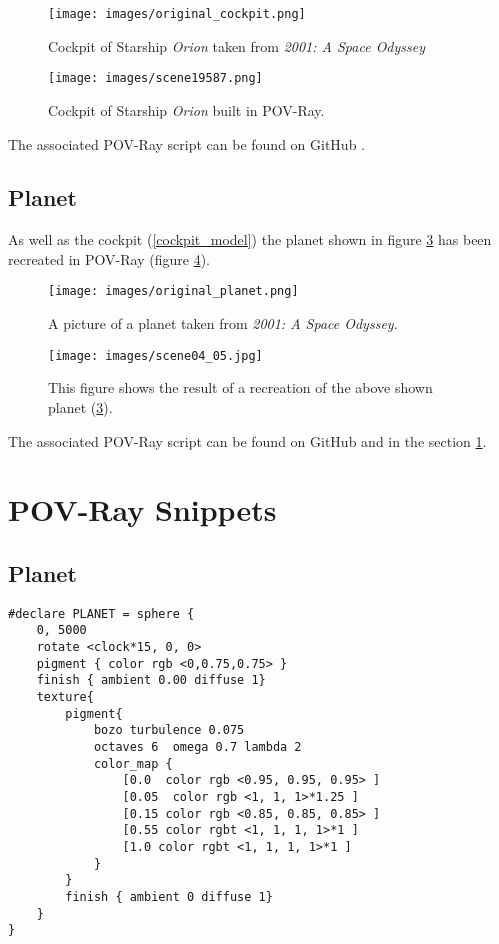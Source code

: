 \begin{figure}[ht]
	\centering
	\texttt{[image: images/original\_cockpit.png]}
	\caption{Cockpit of Starship \textit{Orion} taken from \textit{2001: A Space Odyssey}}
	\label{cockpit_original}
\end{figure}

\begin{figure}[ht]
	\centering
	\texttt{[image: images/scene19587.png]}
	\caption{Cockpit of Starship \textit{Orion} built in POV-Ray.}
	\label{cockpit_povray}
\end{figure}

The associated POV-Ray script can be found on GitHub \cite{Quving}.

\newpage
\subsection{Planet}
As well as the cockpit (\ref{cockpit_model}) the planet shown in figure \ref{planet_original} has been recreated in POV-Ray (figure \ref{planet_povray}).
\begin{figure}[ht]
	\centering
	\texttt{[image: images/original\_planet.png]}
	\caption{A picture of a planet taken from \textit{2001: A Space Odyssey}.}
	\label{planet_original}
\end{figure}

\begin{figure}[ht]
	\centering
	\texttt{[image: images/scene04\_05.jpg]}
	\caption{This figure shows the result of a recreation of the above shown planet (\ref{planet_original}).}
	\label{planet_povray}
\end{figure}

The associated POV-Ray script can be found on GitHub \cite{Quving} and in the section \ref{povray_snippets}.

\newpage
\section{POV-Ray Snippets} \label{povray_snippets}

\subsection{Planet}

\begin{lstlisting}
#declare PLANET = sphere {
	0, 5000
	rotate <clock*15, 0, 0>
	pigment { color rgb <0,0.75,0.75> }
	finish { ambient 0.00 diffuse 1}
	texture{
		pigment{
			bozo turbulence 0.075
			octaves 6  omega 0.7 lambda 2
			color_map {
				[0.0  color rgb <0.95, 0.95, 0.95> ]
				[0.05  color rgb <1, 1, 1>*1.25 ]
				[0.15 color rgb <0.85, 0.85, 0.85> ]
				[0.55 color rgbt <1, 1, 1, 1>*1 ]
				[1.0 color rgbt <1, 1, 1, 1>*1 ]
			}
		}
		finish { ambient 0 diffuse 1}
	}
}
\end{lstlisting}


